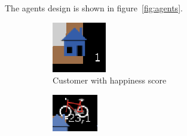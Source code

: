 The agents design is shown in figure~\ref{fig:agents}.
\begin{figure}
     \centering
     \begin{subfigure}[m]{0.1\textwidth}
         \centering
         \includegraphics[width=\textwidth]{sections/pics/cust_happy}
         \caption{Customer with happiness score}
     \end{subfigure}
     \hfill
     \begin{subfigure}[m]{0.1\textwidth}
         \centering
         \includegraphics[width=\textwidth]{sections/pics/del_on_its_way}

\end{subfigure}
\end{figure}
